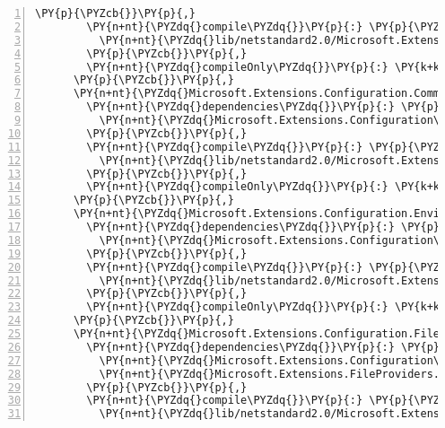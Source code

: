 \begin{Verbatim}[commandchars=\\\{\},numbers=left,firstnumber=1,stepnumber=1,numberblanklines=0]
        \PY{p}{\PYZcb{}}\PY{p}{,}
        \PY{n+nt}{\PYZdq{}compile\PYZdq{}}\PY{p}{:} \PY{p}{\PYZob{}}
          \PY{n+nt}{\PYZdq{}lib/netstandard2.0/Microsoft.Extensions.Configuration.Binder.dll\PYZdq{}}\PY{p}{:} \PY{p}{\PYZob{}}\PY{p}{\PYZcb{}}
        \PY{p}{\PYZcb{}}\PY{p}{,}
        \PY{n+nt}{\PYZdq{}compileOnly\PYZdq{}}\PY{p}{:} \PY{k+kc}{true}
      \PY{p}{\PYZcb{}}\PY{p}{,}
      \PY{n+nt}{\PYZdq{}Microsoft.Extensions.Configuration.CommandLine/2.1.0\PYZhy{}rc1\PYZhy{}final\PYZdq{}}\PY{p}{:} \PY{p}{\PYZob{}}
        \PY{n+nt}{\PYZdq{}dependencies\PYZdq{}}\PY{p}{:} \PY{p}{\PYZob{}}
          \PY{n+nt}{\PYZdq{}Microsoft.Extensions.Configuration\PYZdq{}}\PY{p}{:} \PY{l+s+s2}{\PYZdq{}2.1.0\PYZhy{}rc1\PYZhy{}final\PYZdq{}}
        \PY{p}{\PYZcb{}}\PY{p}{,}
        \PY{n+nt}{\PYZdq{}compile\PYZdq{}}\PY{p}{:} \PY{p}{\PYZob{}}
          \PY{n+nt}{\PYZdq{}lib/netstandard2.0/Microsoft.Extensions.Configuration.CommandLine.dll\PYZdq{}}\PY{p}{:} \PY{p}{\PYZob{}}\PY{p}{\PYZcb{}}
        \PY{p}{\PYZcb{}}\PY{p}{,}
        \PY{n+nt}{\PYZdq{}compileOnly\PYZdq{}}\PY{p}{:} \PY{k+kc}{true}
      \PY{p}{\PYZcb{}}\PY{p}{,}
      \PY{n+nt}{\PYZdq{}Microsoft.Extensions.Configuration.EnvironmentVariables/2.1.0\PYZhy{}rc1\PYZhy{}final\PYZdq{}}\PY{p}{:} \PY{p}{\PYZob{}}
        \PY{n+nt}{\PYZdq{}dependencies\PYZdq{}}\PY{p}{:} \PY{p}{\PYZob{}}
          \PY{n+nt}{\PYZdq{}Microsoft.Extensions.Configuration\PYZdq{}}\PY{p}{:} \PY{l+s+s2}{\PYZdq{}2.1.0\PYZhy{}rc1\PYZhy{}final\PYZdq{}}
        \PY{p}{\PYZcb{}}\PY{p}{,}
        \PY{n+nt}{\PYZdq{}compile\PYZdq{}}\PY{p}{:} \PY{p}{\PYZob{}}
          \PY{n+nt}{\PYZdq{}lib/netstandard2.0/Microsoft.Extensions.Configuration.EnvironmentVariables.dll\PYZdq{}}\PY{p}{:} \PY{p}{\PYZob{}}\PY{p}{\PYZcb{}}
        \PY{p}{\PYZcb{}}\PY{p}{,}
        \PY{n+nt}{\PYZdq{}compileOnly\PYZdq{}}\PY{p}{:} \PY{k+kc}{true}
      \PY{p}{\PYZcb{}}\PY{p}{,}
      \PY{n+nt}{\PYZdq{}Microsoft.Extensions.Configuration.FileExtensions/2.1.0\PYZhy{}rc1\PYZhy{}final\PYZdq{}}\PY{p}{:} \PY{p}{\PYZob{}}
        \PY{n+nt}{\PYZdq{}dependencies\PYZdq{}}\PY{p}{:} \PY{p}{\PYZob{}}
          \PY{n+nt}{\PYZdq{}Microsoft.Extensions.Configuration\PYZdq{}}\PY{p}{:} \PY{l+s+s2}{\PYZdq{}2.1.0\PYZhy{}rc1\PYZhy{}final\PYZdq{}}\PY{p}{,}
          \PY{n+nt}{\PYZdq{}Microsoft.Extensions.FileProviders.Physical\PYZdq{}}\PY{p}{:} \PY{l+s+s2}{\PYZdq{}2.1.0\PYZhy{}rc1\PYZhy{}final\PYZdq{}}
        \PY{p}{\PYZcb{}}\PY{p}{,}
        \PY{n+nt}{\PYZdq{}compile\PYZdq{}}\PY{p}{:} \PY{p}{\PYZob{}}
          \PY{n+nt}{\PYZdq{}lib/netstandard2.0/Microsoft.Extensions.Configuration.FileExtensions.dll\PYZdq{}}\PY{p}{:} \PY{p}{\PYZob{}}\PY{p}{\PYZcb{}}

\end{Verbatim}
